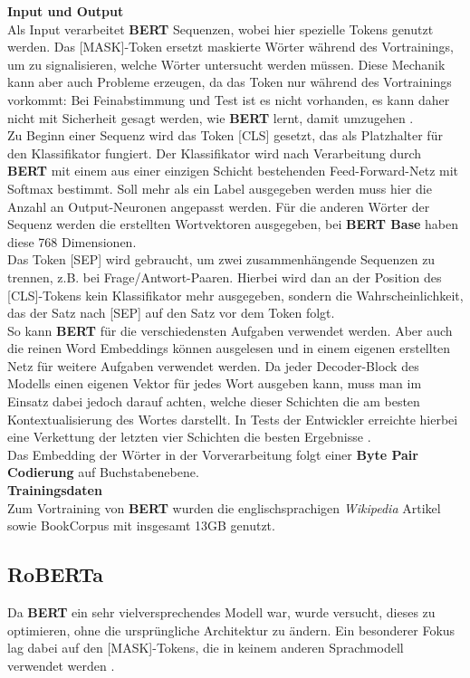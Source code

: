 \textbf{Input und Output}\\
Als Input verarbeitet \textbf{BERT} Sequenzen, wobei hier spezielle Tokens genutzt werden. Das [MASK]-Token ersetzt maskierte W\"orter w\"ahrend des Vortrainings, um zu signalisieren, welche W\"orter untersucht werden m\"ussen. Diese Mechanik kann aber auch Probleme erzeugen, da das Token nur w\"ahrend des Vortrainings vorkommt: Bei Feinabstimmung und Test ist es nicht vorhanden, es kann daher nicht mit Sicherheit gesagt werden, wie \textbf{BERT} lernt, damit umzugehen \cite{xlnetex}.\\
Zu Beginn einer Sequenz wird das Token [CLS] gesetzt, das als Platzhalter f\"ur den Klassifikator fungiert. Der Klassifikator wird nach Verarbeitung durch \textbf{BERT} mit einem aus einer einzigen Schicht bestehenden Feed-Forward-Netz mit Softmax bestimmt. Soll mehr als ein Label ausgegeben werden muss hier die Anzahl an Output-Neuronen angepasst werden. F\"ur die anderen W\"orter der Sequenz werden die erstellten Wortvektoren ausgegeben, bei \textbf{BERT Base} haben diese 768 Dimensionen.\\
Das Token [SEP] wird gebraucht, um zwei zusammenh\"angende Sequenzen zu trennen, z.B. bei Frage/Antwort-Paaren. Hierbei wird dan an der Position des [CLS]-Tokens kein Klassifikator mehr ausgegeben, sondern die Wahrscheinlichkeit, das der Satz nach [SEP] auf den Satz vor dem Token folgt.\\
So kann \textbf{BERT} f\"ur die verschiedensten Aufgaben verwendet werden. Aber auch die reinen Word Embeddings k\"onnen ausgelesen und in einem eigenen erstellten Netz f\"ur weitere Aufgaben verwendet werden. Da jeder Decoder-Block des Modells einen eigenen Vektor f\"ur jedes Wort ausgeben kann, muss man im Einsatz dabei jedoch darauf achten, welche dieser Schichten die am besten Kontextualisierung des Wortes darstellt. In Tests der Entwickler erreichte hierbei eine Verkettung der letzten vier Schichten die besten Ergebnisse \cite{bert}.\\
Das Embedding der W\"orter in der Vorverarbeitung folgt einer \textbf{Byte Pair Codierung} auf Buchstabenebene.\\

\textbf{Trainingsdaten}\\
Zum Vortraining von \textbf{BERT} wurden die englischsprachigen \textit{Wikipedia} Artikel sowie BookCorpus mit insgesamt 13GB genutzt.


\subsection{RoBERTa}
Da \textbf{BERT} ein sehr vielversprechendes Modell war, wurde versucht, dieses zu optimieren, ohne die urspr\"ungliche Architektur zu \"andern. Ein besonderer Fokus lag dabei auf den [MASK]-Tokens, die in keinem anderen Sprachmodell verwendet werden \cite{roberta}.\\

